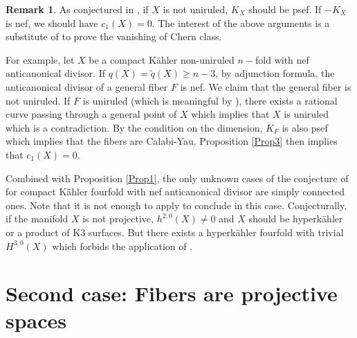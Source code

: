 \documentclass[a4, 12pt]{amsart}
\numberwithin{equation}{section}
\theoremstyle{definition}
\newtheorem{rem}[thm]{Remark}
\begin{document}
\begin{rem}
As conjectured in \cite{BDPP}, if $X$ is not uniruled, $K_X$ should be psef.
If $-K_X$ is nef, we should have $c_1(X)=0$.
The interest of the above arguments is a substitute of \cite{BDPP} to prove the vanishing of Chern class.

For example, let $X$ be a compact K\"ahler non-uniruled $n-$fold with nef anticanonical divisor.
If $q(X)=\tilde{q}(X) \geq n-3$, by adjunction formula, the anticanonical divisor of a general fiber $F$ is nef.
We claim that the general fiber is not uniruled.
If $F$ is uniruled (which is meaningful by \cite{Fu81}),
there exists a rational curve passing through a general point of $X$ which implies that $X$ is uniruled which is a contradiction.
By the condition on the dimension, $K_F$ is also psef which implies that the fibers are Calabi-Yau.
Proposition \ref{Prop3} then implies that $c_1(X)=0$.


Combined with Proposition \ref{Prop1}, the only unknown cases of the conjecture of \cite{BDPP} for compact K\"ahler fourfold with nef anticanonical divisor are simply connected ones.
Note that it is not enough to apply \cite{Bru06} to conclude in this case.
Conjecturally, if the manifold $X$ is not projective, $h^{2,0}(X) \neq 0$ and $X$ should be hyperk\"ahler or a product of K3 surfaces.
But there exists a hyperk\"ahler fourfold with trivial $H^{3,0}(X)$ which forbids the application of \cite{Bru06}.
\end{rem}

\section{Second case: Fibers are projective spaces}
\end{document}
